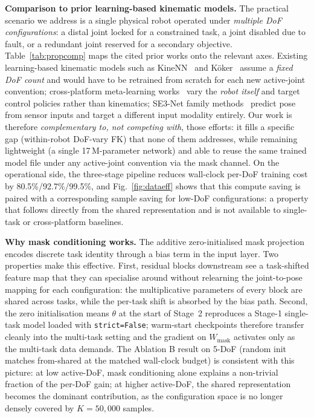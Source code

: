 \documentclass[conference]{IEEEtran}
\begin{document}
\textbf{Comparison to prior learning-based kinematic models.} The practical scenario we address is a single physical robot operated under \emph{multiple DoF configurations}: a distal joint locked for a constrained task, a joint disabled due to fault, or a redundant joint reserved for a secondary objective. Table~\ref{tab:propcomp} maps the cited prior works onto the relevant axes. Existing learning-based kinematic models such as KineNN~\cite{diprasetya2025} and K{\"o}ker~\cite{koker2004} assume a \emph{fixed DoF count} and would have to be retrained from scratch for each new active-joint convention; cross-platform meta-learning works~\cite{devin2017,chen2018,ghadirzadeh2021} vary the \emph{robot itself} and target control policies rather than kinematics; SE3-Net family methods~\cite{byravan2017,byravan2018} predict pose from sensor inputs and target a different input modality entirely. Our work is therefore \emph{complementary to, not competing with}, those efforts: it fills a specific gap (within-robot DoF-vary FK) that none of them addresses, while remaining lightweight (a single 17\,M-parameter network) and able to reuse the same trained model file under any active-joint convention via the mask channel. On the operational side, the three-stage pipeline reduces wall-clock per-DoF training cost by 80.5\%/92.7\%/99.5\%, and Fig.~\ref{fig:dataeff} shows that this compute saving is paired with a corresponding sample saving for low-DoF configurations: a property that follows directly from the shared representation and is not available to single-task or cross-platform baselines.



\textbf{Why mask conditioning works.} The additive zero-initialised mask projection encodes discrete task identity through a bias term in the input layer. Two properties make this effective. First, residual blocks downstream see a task-shifted feature map that they can specialise around without relearning the joint-to-pose mapping for each configuration: the multiplicative parameters of every block are shared across tasks, while the per-task shift is absorbed by the bias path. Second, the zero initialisation means $\theta$ at the start of Stage~2 reproduces a Stage-1 single-task model loaded with \texttt{strict=False}; warm-start checkpoints therefore transfer cleanly into the multi-task setting and the gradient on $W_{\mathrm{mask}}$ activates only as the multi-task data demands. The Ablation B result on 5-DoF (random init matches from-shared at the matched wall-clock budget) is consistent with this picture: at low active-DoF, mask conditioning alone explains a non-trivial fraction of the per-DoF gain; at higher active-DoF, the shared representation becomes the dominant contribution, as the configuration space is no longer densely covered by $K\!=\!50{,}000$ samples.
\end{document}
